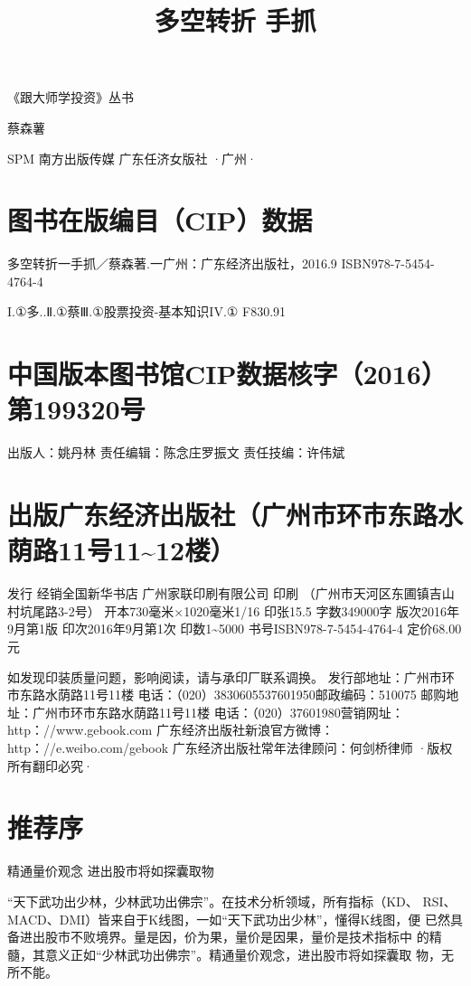 \documentclass{article}
\title{多空转折 手抓}
\date{}
\begin{document}
\maketitle
《跟大师学投资》丛书

蔡森薯

SPM 南方出版传媒 广东任济女版社 ·广州·

\clearpage

\section{图书在版编目（CIP）数据}

多空转折一手抓／蔡森著.一广州：广东经济出版社，2016.9 ISBN978-7-5454-4764-4

I.①多..Ⅱ.①蔡Ⅲ.①股票投资-基本知识IV.① F830.91

\section{中国版本图书馆CIP数据核字（2016）第199320号}

出版人：姚丹林 责任编辑：陈念庄罗振文 责任技编：许伟斌

\section{出版广东经济出版社（广州市环市东路水荫路11号11\textasciitilde{}12楼）}

发行 经销全国新华书店 广州家联印刷有限公司 印刷 （广州市天河区东圃镇吉山村坑尾路3-2号） 开本730毫米×1020毫米1/16 印张15.5 字数349000字 版次2016年9月第1版 印次2016年9月第1次 印数1\textasciitilde{}5000 书号ISBN978-7-5454-4764-4 定价68.00元

如发现印装质量问题，影响阅读，请与承印厂联系调换。 发行部地址：广州市环市东路水荫路11号11楼 电话：（020）3830605537601950邮政编码：510075 邮购地址：广州市环市东路水荫路11号11楼 电话：（020）37601980营销网址：http：//www.gebook.com 广东经济出版社新浪官方微博：http：//e.weibo.com/gebook 广东经济出版社常年法律顾问：何剑桥律师 ·版权所有翻印必究·

\clearpage

\section{推荐序}

精通量价观念 进出股市将如探囊取物

“天下武功出少林，少林武功出佛宗”。在技术分析领域，所有指标（KD、 RSI、MACD、DMI）皆来自于K线图，一如“天下武功出少林”，懂得K线图，便 已然具备进出股市不败境界。量是因，价为果，量价是因果，量价是技术指标中 的精髓，其意义正如“少林武功出佛宗”。精通量价观念，进出股市将如探囊取 物，无所不能。
\end{document}
